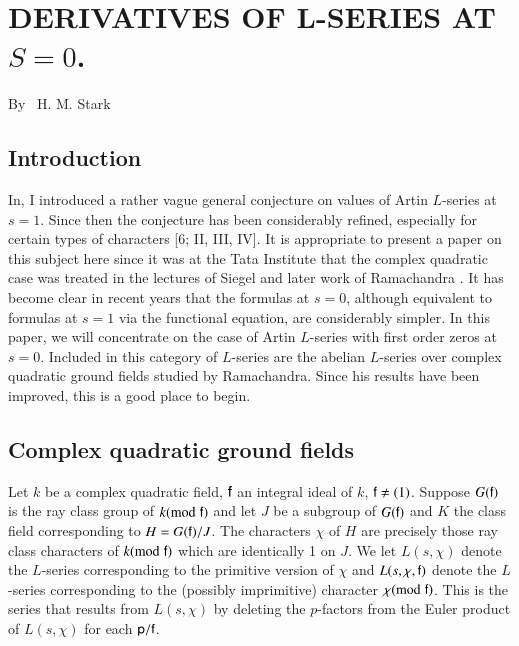 \chapter{DERIVATIVES OF L-SERIES AT $S=0$.}


\begin{center}
{\large By~ H. M. Stark}
\end{center}

\bigskip

\setcounter{pageoriginal}{260}

\section{Introduction}\label{art9-sec1}
In, I introduced \cite{art9-5} a rather vague general conjecture on values of Artin $L$-series at $s =1$. Since then the conjecture has been considerably refined, especially for certain types of characters [6; II, III, IV]. It is appropriate to present a paper on this subject here since it was at the Tata Institute that the complex quadratic case was treated in the lectures of Siegel \cite{art9-4} and later work of Ramachandra \cite{art9-3}. It has become clear in recent years that the formulas at $s = 0$, although equivalent to formulas at $s =1$ via the functional equation, are considerably simpler. In this paper, we will concentrate on the case of Artin $L$-series with first order zeros at $s =0$. Included in this category of $L$-series are the abelian $L$-series over complex quadratic ground fields studied by Ramachandra. Since his results have been improved, this is a good place to begin.

\section{Complex quadratic ground fields}\label{art8-sec2} 
Let $k$ be a complex quadratic field, $\mathsf{f}$ an integral ideal of $k$, $\mathsf{f} \neq (1)$. Suppose $G(\mathsf{f})$ is the ray class group of $k({\rm{mod}}\kern.3em \mathsf{f})$ and let $J$ be a subgroup of $G(\mathsf{f})$  and $K$ the class field corresponding to $H = G (\mathsf{f})/J$. The characters $\chi$ of $H$ are precisely those ray class characters of $k ({\rm{mod}}\kern.3em \mathsf{f})$ which are identically 1 on $J$. We let $L (s, \chi)$ denote the $L$-series corresponding to the primitive version of $\chi$ and $L(s,\chi, \mathsf{f})$ denote the $L$-series corresponding to the (possibly imprimitive)  character $\chi ({\rm{mod}}\kern.3em \mathsf{f})$. This is the series that results from $L(s, \chi)$ by deleting the $p$-factors from the Euler product of $L(s, \chi)$ for each $\mathsf{p}/\mathsf{f}$.

